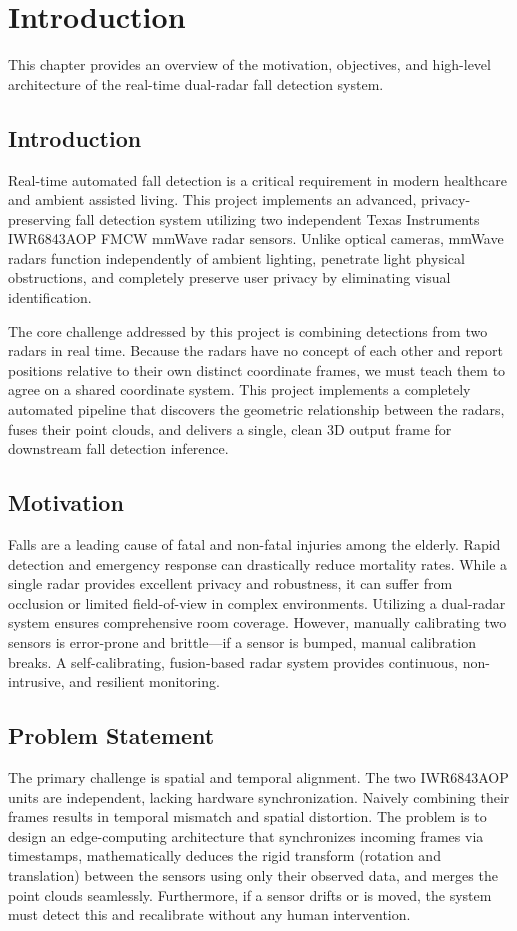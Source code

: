 \chapter{Introduction}
This chapter provides an overview of the motivation, objectives, and high-level architecture of the real-time dual-radar fall detection system.

\section[Introduction]{\textbf{Introduction}}
Real-time automated fall detection is a critical requirement in modern healthcare and ambient assisted living. This project implements an advanced, privacy-preserving fall detection system utilizing two independent Texas Instruments IWR6843AOP FMCW mmWave radar sensors. Unlike optical cameras, mmWave radars function independently of ambient lighting, penetrate light physical obstructions, and completely preserve user privacy by eliminating visual identification. 

The core challenge addressed by this project is combining detections from two radars in real time. Because the radars have no concept of each other and report positions relative to their own distinct coordinate frames, we must teach them to agree on a shared coordinate system. This project implements a completely automated pipeline that discovers the geometric relationship between the radars, fuses their point clouds, and delivers a single, clean 3D output frame for downstream fall detection inference.

\section[Motivation]{\textbf{Motivation}}
Falls are a leading cause of fatal and non-fatal injuries among the elderly. Rapid detection and emergency response can drastically reduce mortality rates. While a single radar provides excellent privacy and robustness, it can suffer from occlusion or limited field-of-view in complex environments. Utilizing a dual-radar system ensures comprehensive room coverage. However, manually calibrating two sensors is error-prone and brittle—if a sensor is bumped, manual calibration breaks. A self-calibrating, fusion-based radar system provides continuous, non-intrusive, and resilient monitoring.

\section[Problem Statement]{\textbf{Problem Statement}}
The primary challenge is spatial and temporal alignment. The two IWR6843AOP units are independent, lacking hardware synchronization. Naively combining their frames results in temporal mismatch and spatial distortion. The problem is to design an edge-computing architecture that synchronizes incoming frames via timestamps, mathematically deduces the rigid transform (rotation and translation) between the sensors using only their observed data, and merges the point clouds seamlessly. Furthermore, if a sensor drifts or is moved, the system must detect this and recalibrate without any human intervention.

